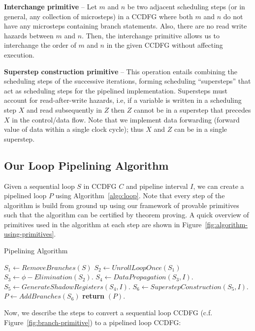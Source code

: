 {\textbf {Interchange primitive}} -- Let $m$ and $n$ be two adjacent scheduling steps (or in general, any collection of microsteps) in a CCDFG where both $m$ and $n$ do not have any microsteps containing branch statements. Also, there are no read write hazards between $m$ and $n$. Then, the interchange primitive allows us to interchange the order of $m$ and $n$ in the given CCDFG without affecting execution. 

{\textbf {Superstep construction primitive}} -- This operation entails combining the scheduling steps of the successive
iterations, forming scheduling ``supersteps'' that act as scheduling steps for the pipelined implementation. Supersteps must
account for read-after-write hazards, i.e, if a variable is written in a scheduling step $X$ and read subsequently in
$Z$ then $Z$ cannot be in a superstep that precedes $X$ in the control/data flow.  Note that we implement data
forwarding (forward value of data within a single clock cycle); thus $X$ and $Z$ can be in a single superstep.

\subsection{Our Loop Pipelining Algorithm}

Given a sequential loop $S$ in CCDFG $C$ and pipeline interval $I$, we can create a pipelined loop $P$ using Algorithm~\ref{algo:loop}. Note that every step of the algorithm is build from ground up using our framework of provable primitives such that the algorithm can be certified by theorem proving. A quick overview of primitives used in the algorithm at each step are shown in Figure~\ref{fig:algorithm-using-primitives}.

\begin{algorithm}[H]
\caption{Pipelining Algorithm}
\label{algo:loop}
\begin{algorithmic}[1]
\State $S_1 \leftarrow RemoveBranches(S)$
\State $S_2 \leftarrow UnrollLoopOnce(S_1)$
\State $S_3 \leftarrow \phi-Elimination (S_2) $.
\State $S_4 \leftarrow DataPropagation (S_3, I) $.
\State $S_5 \leftarrow GenerateShadowRegisters (S_4, I) $.
\State $ S_6 \leftarrow SuperstepConstruction (S_5, I) $.
\State $P \leftarrow AddBranches (S_6) $
\State \textbf{return} $(P)$.
\EndProcedure
\end{algorithmic}
\end{algorithm}

Now, we describe the steps to convert a sequential loop CCDFG (c.f. Figure~\ref{fig:branch-primitive}) to a pipelined loop CCDFG:

